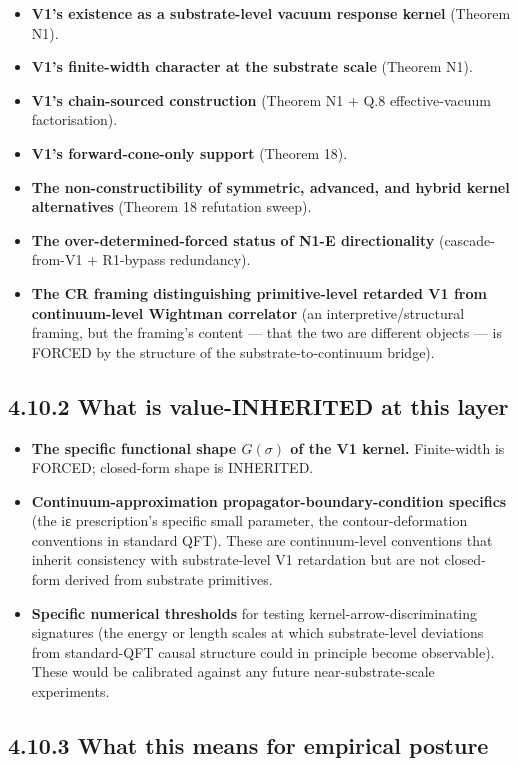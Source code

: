 \documentclass[11pt]{book}
\begin{document}
\begin{itemize}
\item \textbf{V1's existence as a substrate-level vacuum response kernel} (Theorem N1).
\item \textbf{V1's finite-width character at the substrate scale} (Theorem N1).
\item \textbf{V1's chain-sourced construction} (Theorem N1 + Q.8 effective-vacuum factorisation).
\item \textbf{V1's forward-cone-only support} (Theorem 18).
\item \textbf{The non-constructibility of symmetric, advanced, and hybrid kernel alternatives} (Theorem 18 refutation sweep).
\item \textbf{The over-determined-forced status of N1-E directionality} (cascade-from-V1 + R1-bypass redundancy).
\item \textbf{The CR framing distinguishing primitive-level retarded V1 from continuum-level Wightman correlator} (an interpretive/structural framing, but the framing's content — that the two are different objects — is FORCED by the structure of the substrate-to-continuum bridge).
\end{itemize}

\subsection{4.10.2 What is value-INHERITED at this layer}

\begin{itemize}
\item \textbf{The specific functional shape $G(\sigma)$ of the V1 kernel.} Finite-width is FORCED; closed-form shape is INHERITED.
\item \textbf{Continuum-approximation propagator-boundary-condition specifics} (the iε prescription's specific small parameter, the contour-deformation conventions in standard QFT). These are continuum-level conventions that inherit consistency with substrate-level V1 retardation but are not closed-form derived from substrate primitives.
\item \textbf{Specific numerical thresholds} for testing kernel-arrow-discriminating signatures (the energy or length scales at which substrate-level deviations from standard-QFT causal structure could in principle become observable). These would be calibrated against any future near-substrate-scale experiments.
\end{itemize}

\subsection{4.10.3 What this means for empirical posture}
\end{document}
